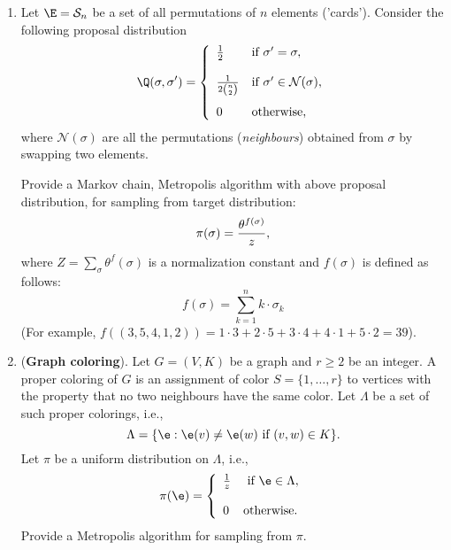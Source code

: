 \documentclass[a4paper,12pt]{article}
\begin{document}
\begin{enumerate}
 \item Let $\E=\mathcal{S}_n$ be a set of all permutations of $n$ elements ('cards').
 Consider the following proposal distribution 
 $$\Q(\sigma,\sigma')=
 \left\{ 
 \begin{array}{llllllll}
  {1\over 2} & \textrm{if } \sigma'=\sigma, \\[12pt] 
  {1\over 2 {n\choose 2}} & \textrm{if } \sigma'\in\mathcal{N}(\sigma), \\[12pt] 
  0  & \textrm{otherwise}, 
 \end{array}
\right.$$
where $\mathcal{N}(\sigma)$ are all the permutations (\textsl{neighbours}) obtained from $\sigma$ by swapping two elements.

\smallskip\par 
Provide a Markov chain, Metropolis algorithm with above proposal distribution, for sampling 
from target distribution:
$$\pi(\sigma)={\theta^{f(\sigma)}\over z},$$
where $Z=\sum_{\sigma} \theta^f(\sigma)$ is a normalization constant and $f(\sigma)$ is defined as follows:
$$f(\sigma)=\sum_{k=1}^n k\cdot \sigma_k$$
(For example, $f((3,5,4,1,2))=1\cdot 3 + 2\cdot 5+3\cdot 4 + 4\cdot 1 + 5\cdot 2 = 39$).
  
\item (\textbf{Graph coloring}). Let $G=(V,K)$ be a graph and $r\geq 2$ be an integer.
A proper coloring of $G$ is an assignment of color $S=\{1,\ldots,r\}$ to vertices
with the property that no two neighbours have the same color. Let $\Lambda$ be a set of such proper colorings,
i.e.,
$$\Lambda=\{\e: \e(v)\neq \e(w) \textrm{ if } (v,w)\in K\}. $$
Let $\pi$ be a uniform distribution on $\Lambda$, i.e.,
$$\pi(\e)=
\left\{
\begin{array}{llll}
{1\over z} & \textrm{ if } \e\in\Lambda,\\[12pt]
0 & \textrm{otherwise}.
\end{array}
\right.$$
Provide a Metropolis algorithm for sampling from $\pi$.


\end{enumerate}
\end{document}
